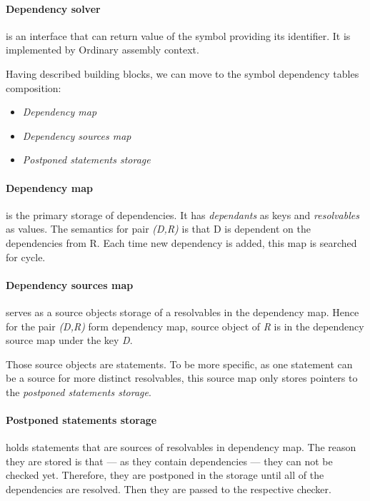 \paragraph*{Dependency solver} is an interface that can return value of the symbol providing its identifier. It is implemented by Ordinary assembly context.

\vspace{0.5cm}

Having described building blocks, we can move to the symbol dependency tables composition:
\begin{itemize}
	\item \emph{Dependency map}
	\item \emph{Dependency sources map}
	\item \emph{Postponed statements storage}
\end{itemize}

\paragraph*{Dependency map} is the primary storage of dependencies. It has \emph{dependants} as keys and \emph{resolvables} as values. The semantics for pair \emph{(D,R)} is that D is dependent on the dependencies from R. Each time new dependency is added, this map is searched for cycle.

\paragraph*{Dependency sources map} serves as a source objects storage of a resolvables in the dependency map. Hence for the pair \emph{(D,R)} form dependency map, source object of \emph{R} is in the dependency source map under the key \emph{D}. 

Those source objects are statements. To be more specific, as one statement can be a source for more distinct resolvables, this source map only stores pointers to the \emph{postponed statements storage}.

\paragraph*{Postponed statements storage} holds statements that are sources of resolvables in dependency map. The reason they are stored is that --- as they contain dependencies --- they can not be checked yet. Therefore, they are postponed in the storage until all of the dependencies are resolved. Then they are passed to the respective checker.



